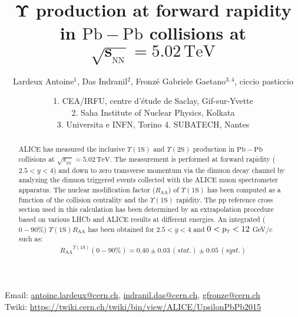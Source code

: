 \documentclass[ALICE,manyauthors]{ALICE_analysis_notes}
\newcommand {\sep}        {\xspace}
\newcommand {\pt}        {\ensuremath{p_{\mathrm{\textsc{t}}}}\xspace}
\newcommand {\sqrtSnn}   {\ensuremath{\sqrt{s_{_{\mathrm{NN}}}}}}
\newcommand {\sqrtSnnE}[2][TeV]  {$\sqrtSnn = #2\,\mathrm{#1}$}
\newcommand {\sqrtSnnEb}[2][TeV]  {$\boldsymbol{\sqrtSnn = #2\,\mathrm{#1}}$}
\newcommand {\Raa}       {\ensuremath{R_\mathrm{AA}}}
\newcommand {\ups}      {\ensuremath{\Upsilon\mathrm{(1S)}}\xspace}
\newcommand {\upsp}      {\ensuremath{\Upsilon\mathrm{(2S)}}\xspace}
\newcommand {\PbPb}      {\ensuremath{\mathrm{Pb-Pb}}}
\newcommand {\PbPbb}      {\ensuremath{\boldsymbol{\mathrm{Pb-Pb}}}}
\begin{document}
\begin{titlepage}

\PHdate{\today}

\title{ $\boldsymbol{\Upsilon}$ production at forward rapidity\\ in \PbPbb\sep collisions at \sqrtSnnEb{5.02} }
\ShortTitle{$\Upsilon$ production in \PbPb\space collisions}   %

\author{Lardeux Antoine$^{1}$, Das Indranil$^{2}$, Fronz\'e Gabriele Gaetano$^{3, 4}$, ciccio pasticcio}
\author{
1. CEA/IRFU, centre d'\'etude de Saclay, Gif-sur-Yvette\\
2. Saha Institute of Nuclear Physics, Kolkata\\
3. Universita e INFN, Torino
4. SUBATECH, Nantes\\
}

\begin{center} 
Email: \href{mailto:antoine.lardeux@cern.ch}{antoine.lardeux@cern.ch}, \href{mailto:indranil.das@cern.ch}{indranil.das@cern.ch}, \href{mailto:gfronze@cern.ch}{gfronze@cern.ch} \\ 
Twiki: \url{https://twiki.cern.ch/twiki/bin/view/ALICE/UpsilonPbPb2015} 
\end{center} 



\begin{abstract}
ALICE has measured the inclusive \ups\sep and \upsp\sep production in \PbPb\sep collisions at \sqrtSnnE{5.02}. 
The measurement is performed at forward rapidity ($2.5<y<4$) and down to zero transverse momentum via the dimuon decay channel by analyzing the dimuon triggered events collected with the ALICE muon spectrometer apparatus. 
The nuclear modification factor (\Raa) of \ups\sep has been computed as a function of the collision centrality and the \ups\sep rapidity.
The pp reference cross section used in this calculation has been determined by an extrapolation procedure based on various LHCb and ALICE results at different energies.
An integrated ($0-90\%$) \ups\sep \Raa\sep has been obtained for $2.5<y<4$ and $0<\pt<12$ GeV/$c$ such as:
\begin{align*}
\Raa^{\ups} (0-90\%)=0.40 \pm 0.03 \,(stat.) \pm 0.05 \,(syst.)
\end{align*}

\end{abstract}

\end{titlepage}
\end{document}
